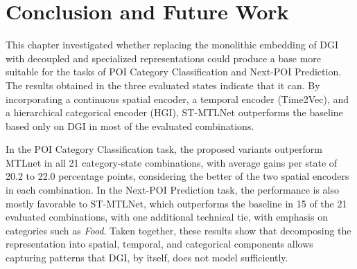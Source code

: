 \section{Conclusion and Future Work}
\label{sec:courb:conclusion}

This chapter investigated whether replacing the monolithic embedding of DGI with decoupled and specialized representations could produce a base more suitable for the tasks of POI Category Classification and Next-POI Prediction. The results obtained in the three evaluated states indicate that it can. By incorporating a continuous spatial encoder, a temporal encoder (Time2Vec), and a hierarchical categorical encoder (HGI), ST-MTLNet outperforms the baseline based only on DGI in most of the evaluated combinations.

In the POI Category Classification task, the proposed variants outperform MTLnet in all 21 category-state combinations, with average gains per state of 20.2 to 22.0 percentage points, considering the better of the two spatial encoders in each combination. In the Next-POI Prediction task, the performance is also mostly favorable to ST-MTLNet, which outperforms the baseline in 15 of the 21 evaluated combinations, with one additional technical tie, with emphasis on categories such as \textit{Food}. Taken together, these results show that decomposing the representation into spatial, temporal, and categorical components allows capturing patterns that DGI, by itself, does not model sufficiently.

